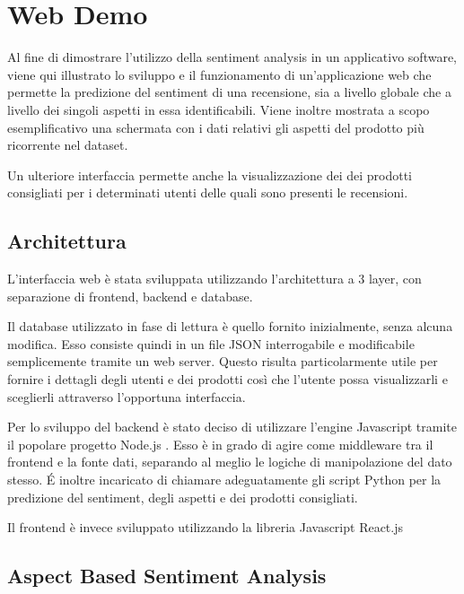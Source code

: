 \documentclass[hidelinks, 12pt]{article}
\begin{document}
\clearpage



\section{Web Demo}
\label{sec:ui}

Al fine di dimostrare l'utilizzo della sentiment analysis in un applicativo software, viene qui illustrato lo sviluppo e il funzionamento di un'applicazione web che permette la predizione del sentiment di una recensione, sia a livello globale che a livello dei singoli aspetti in essa identificabili. Viene inoltre mostrata a scopo esemplificativo una schermata con i dati relativi gli aspetti del prodotto più ricorrente nel dataset.

Un ulteriore interfaccia permette anche la visualizzazione dei dei prodotti consigliati per i determinati utenti delle quali sono presenti le recensioni.

\subsection{Architettura}

L'interfaccia web è stata sviluppata utilizzando l'architettura a 3 layer, con separazione di frontend, backend e database.

Il database utilizzato in fase di lettura è quello fornito inizialmente, senza alcuna modifica. Esso consiste quindi in un file JSON interrogabile e modificabile semplicemente tramite un web server. Questo risulta particolarmente utile per fornire i dettagli degli utenti e dei prodotti così che l'utente possa visualizzarli e sceglierli attraverso l'opportuna interfaccia.

Per lo sviluppo del backend è stato deciso di utilizzare l'engine Javascript tramite il popolare progetto Node.js \cite{site:nodejs}. Esso è in grado di agire come middleware tra il frontend e la fonte dati, separando al meglio le logiche di manipolazione del dato stesso. \'E inoltre incaricato di chiamare adeguatamente gli script Python per la predizione del sentiment, degli aspetti e dei prodotti consigliati.

Il frontend è invece sviluppato utilizzando la libreria Javascript React.js \cite{site:react}


\subsection{Aspect Based Sentiment Analysis}
\label{sec:ui_abas}
\end{document}
